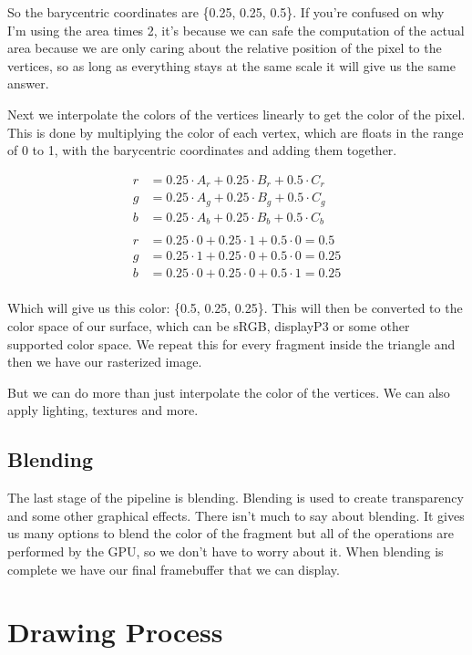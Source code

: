 \documentclass[12pt]{report} \usepackage{preamble}
\begin{document}
So the barycentric coordinates are \{0.25, 0.25, 0.5\}.
If you're confused on why I'm using the area times 2, it's because we can safe the
computation of the actual area because we are only caring about
the relative position of the pixel to the vertices, so as long as everything stays
at the same scale it will give us the same answer.

Next we interpolate the colors of the vertices linearly to get the color of the pixel.
This is done by multiplying the color of each vertex, which are floats in the range of 0 to 1,
with the barycentric coordinates and adding them together.

\[
	\begin{aligned}
		r & = 0.25 \cdot A_r + 0.25 \cdot B_r + 0.5 \cdot C_r  \\
		g & = 0.25 \cdot A_g + 0.25 \cdot B_g + 0.5 \cdot C_g  \\
		b & = 0.25 \cdot A_b + 0.25 \cdot B_b + 0.5 \cdot C_b  \\
		\\
		r & = 0.25 \cdot 0 + 0.25 \cdot 1 + 0.5 \cdot 0 = 0.5  \\
		g & = 0.25 \cdot 1 + 0.25 \cdot 0 + 0.5 \cdot 0 = 0.25 \\
		b & = 0.25 \cdot 0 + 0.25 \cdot 0 + 0.5 \cdot 1 = 0.25 \\
	\end{aligned}
\]

Which will give us this color: \{0.5, 0.25, 0.25\}. This will then be converted to the color
space of our surface, which can be sRGB, displayP3 or some other supported color space.
We repeat this for every fragment inside the triangle and then we have our rasterized image.

But we can do more than just interpolate the color of the vertices.
We can also apply lighting, textures and more.

\subsection{Blending}

The last stage of the pipeline is blending. Blending is used to create transparency
and some other graphical effects. There isn't much to say about blending.
It gives us many options to blend the color of the fragment but all of the operations are
performed by the GPU, so we don't have to worry about it.
When blending is complete we have our final framebuffer that we can display.

\section{Drawing Process}
\end{document}
